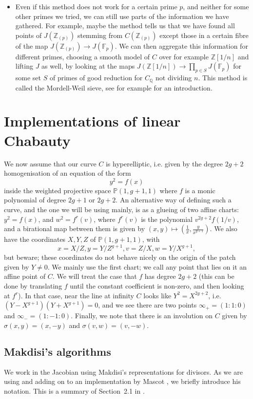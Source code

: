 \documentclass[12pt]{article}
\newcommand{\Z}{\mathbb{Z}}
\newcommand{\Q}{\mathbb{Q}}
\renewcommand{\P}{\mathbb{P}}
\newcommand{\F}{\mathbb{F}}
\theoremstyle{plain}
\theoremstyle{definition}
\theoremstyle{remark}
\begin{document}
\begin{itemize}
\item Even if this method does not work for a certain prime $p$, and neither for some other primes we tried, we can still use parts of the information we have gathered. For example, maybe the method tells us that we have found all points of $J(\Z_{(p)})$ stemming from $C(\Z_{(p)})$ except those in a certain fibre of the map $J(\Z_{(p)}) \to J(\F_p)$. We can then aggregate this information for different primes, choosing a smooth model of $C$ over for example $\Z[1/n]$ and lifting $J$ as well, by looking at the maps $J(\Z[1/n]) \to \prod_{p \in S} J(\F_p)$ for some set $S$ of primes of good reduction for $C_{\Q}$ not dividing $n$. This method is called the Mordell-Weil sieve, see for example \cite{stoll10} for an introduction.
\end{itemize}

\section{Implementations of linear Chabauty}
\label{section:explicit}
We now assume that our curve $C$ is hyperelliptic, i.e. given by the degree $2g+2$ homogenisation of an equation of the form
\[
y^2 = f(x)
\]
inside the weighted projective space $\P(1,g+1,1)$ where $f$ is a monic polynomial of degree $2g+1$ or $2g+2$. An alternative way of defining such a curve, and the one we will be using mainly, is as a glueing of two affine charts: $y^2 = f(x)$, and $w^2 = f^{r}(v)$, where $f^{r}(v)$ is the polynomial $v^{2g + 2} f(1/v)$, and a birational map between them is given by $(x,y) \mapsto (\frac{1}{x},\frac{y}{x^{g+1}})$. We also have the coordinates $X,Y,Z$ of $\P(1,g+1,1)$, with \[x = X/Z, y = Y/Z^{g+1}, v = Z/X, w = Y/X^{g+1},\] but beware; these coordinates do not behave nicely on the origin of the patch given by $Y \neq 0$. We mainly use the first chart; we call any point that lies on it an affine point of $C$. We will treat the case that $f$ has degree $2g+2$ (this can be done by translating $f$ until the constant coefficient is non-zero, and then looking at $f^r$). In that case, near the line at infinity $C$ looks like $Y^2 = X^{2g+2}$, i.e. $(Y-X^{g+1})(Y+X^{g+1}) = 0$, and we see there are two points $\infty_+ = (1:1:0)$ and $\infty_- = (1:-1:0)$. Finally, we note that there is an involution on $C$ given by $\sigma(x,y) = (x,-y)$ and $\sigma(v,w) = (v,-w)$.

\subsection{Makdisi's algorithms}
We work in the Jacobian using Makdisi's representations for divisors. As we are using and adding on to an implementation by Mascot \cite{mascot18}, we briefly introduce his notation. This is a summary of Section~2.1 in \cite{mascot18}.
\end{document}
